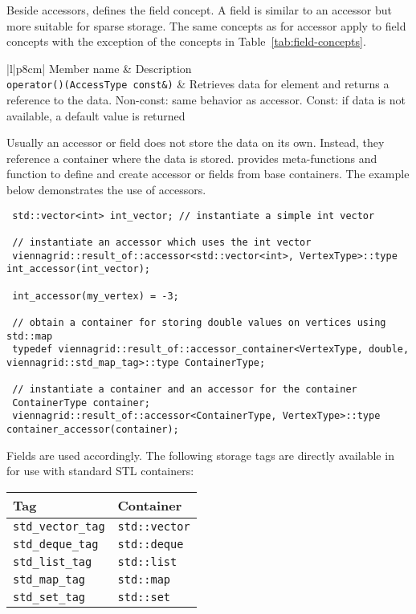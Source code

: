 Beside accessors, {\ViennaGrid} defines the field concept.
A field is similar to an accessor but more suitable for sparse storage.
The same concepts as for accessor apply to field concepts with the exception of the concepts in Table~\ref{tab:field-concepts}.

 \begin{table}[tbp]
 \begin{center}
  \begin{tabular}{|l|p{8cm}|}
   \hline
   Member name & Description \\
   \hline
   \lstinline|operator()(AccessType const&)| & Retrieves data for element and returns a reference to the data. Non-const: same behavior as accessor. Const: if data is not available, a default value is returned \\
   \hline
  \end{tabular}
 \end{center}
 \caption{Field concept. Same as the accessor concept except for the const-access case.}
 \label{tab:field-concepts}
 \end{table}

Usually an accessor or field does not store the data on its own.
Instead, they reference a container where the data is stored.
{\ViennaGrid} provides meta-functions and function to define and create accessor or fields from base containers.
The example below demonstrates the use of {\ViennaGrid} accessors.
\pagebreak
 \begin{lstlisting}
 std::vector<int> int_vector; // instantiate a simple int vector

 // instantiate an accessor which uses the int vector
 viennagrid::result_of::accessor<std::vector<int>, VertexType>::type int_accessor(int_vector);

 int_accessor(my_vertex) = -3;

 // obtain a container for storing double values on vertices using std::map
 typedef viennagrid::result_of::accessor_container<VertexType, double, viennagrid::std_map_tag>::type ContainerType;

 // instantiate a container and an accessor for the container
 ContainerType container;
 viennagrid::result_of::accessor<ContainerType, VertexType>::type container_accessor(container);
\end{lstlisting}
Fields are used accordingly. The following storage tags are directly available in {\ViennaGridminorversion} for use with standard STL containers:
\begin{center}
\begin{tabular}{|l|l|}
 \hline
 Tag              & Container \\
 \hline
 \lstinline|std_vector_tag|   &  \lstinline|std::vector| \\
 \lstinline|std_deque_tag|    &  \lstinline|std::deque|  \\
 \lstinline|std_list_tag|     &  \lstinline|std::list|   \\
 \lstinline|std_map_tag|      &  \lstinline|std::map|    \\
 \lstinline|std_set_tag|      &  \lstinline|std::set|    \\
 \hline
\end{tabular}
\end{center}
